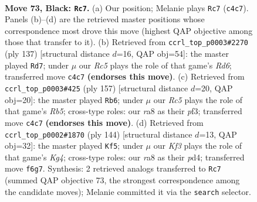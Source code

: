 \documentclass[11pt]{article}
\begin{document}
\clearpage

\begin{figure}[p]\centering
\begin{subfigure}{0.46\textwidth}\centering
\resizebox{\linewidth}{!}{%
\newchessgame
\chessboard[
  setfen={R7/5p2/3Rpk2/8/P1r1P3/5PK1/8/8 b - - 38 73},
  showmover=false,
  pgfstyle=straightmove, color=movearrow, markmove={c4-c7}
]}
\caption{}
\end{subfigure}\hfill
\begin{subfigure}{0.46\textwidth}\centering
\resizebox{\linewidth}{!}{%
\newchessgame
\chessboard[
  setfen={8/7p/5Rpk/8/8/3r3P/6PK/8 b - - 0 69},
  showmover=false,
  pgfstyle=straightmove, color=movearrow, markmove={d3-d7}
]}
\caption{}
\end{subfigure}
\\[4pt]
\begin{subfigure}{0.46\textwidth}\centering
\resizebox{\linewidth}{!}{%
\newchessgame
\chessboard[
  setfen={8/2R2pk1/7p/5P2/1r4P1/5PK1/8/8 b - - 44 79},
  showmover=false,
  pgfstyle=straightmove, color=movearrow, markmove={b4-b6}
]}
\caption{}
\end{subfigure}\hfill
\begin{subfigure}{0.46\textwidth}\centering
\resizebox{\linewidth}{!}{%
\newchessgame
\chessboard[
  setfen={8/7k/2R4p/8/2pp1PK1/6P1/1Pr5/8 w - - 2 73},
  showmover=false,
  pgfstyle=straightmove, color=movearrow, markmove={g4-f5}
]}
\caption{}
\end{subfigure}
\caption{\textbf{Move 73, Black: \texttt{Rc7}.} (a) Our position; Melanie plays \texttt{Rc7} (\texttt{c4c7}). Panels (b)--(d) are the retrieved master positions whose correspondence most drove this move (highest QAP objective among those that transfer to it). (b) Retrieved from \texttt{ccrl\_top\_p0003\#2270} (ply 137) [structural distance $d$=16, QAP obj=54]: the master played \texttt{Rd7}; under $\mu$ our \emph{Rc5} plays the role of that game's \emph{Rd6}; transferred move \texttt{c4c7} \textbf{(endorses this move)}. (c) Retrieved from \texttt{ccrl\_top\_p0003\#425} (ply 157) [structural distance $d$=20, QAP obj=20]: the master played \texttt{Rb6}; under $\mu$ our \emph{Rc5} plays the role of that game's \emph{Rb5}; cross-type roles: our \emph{r}a8 as their \emph{p}f3; transferred move \texttt{c4c7} \textbf{(endorses this move)}. (d) Retrieved from \texttt{ccrl\_top\_p0002\#1870} (ply 144) [structural distance $d$=13, QAP obj=32]: the master played \texttt{Kf5}; under $\mu$ our \emph{Kf3} plays the role of that game's \emph{Kg4}; cross-type roles: our \emph{r}a8 as their \emph{p}d4; transferred move \texttt{f6g7}. Synthesis: 2 retrieved analogs transferred to \texttt{Rc7} (summed QAP objective 73, the strongest correspondence among the candidate moves); Melanie committed it via the \texttt{search} selector.}
\label{fig:thought-m145}
\end{figure}
\end{document}
